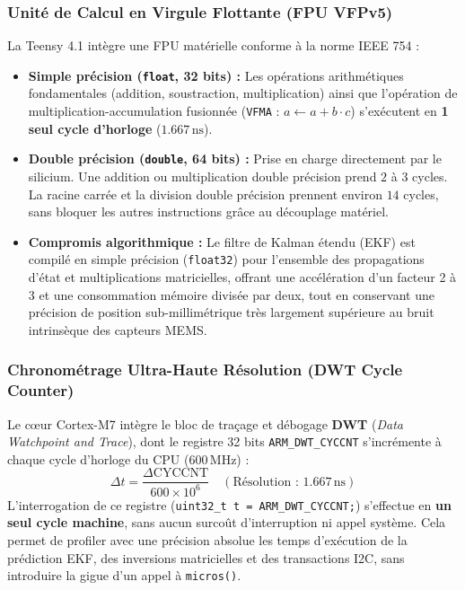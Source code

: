 \documentclass[../Materiel.tex]{subfiles}
\begin{document}
\subsubsection{Unité de Calcul en Virgule Flottante (FPU VFPv5)}
La Teensy 4.1 intègre une FPU matérielle conforme à la norme IEEE 754 :
\begin{itemize}
    \item \textbf{Simple précision (\texttt{float}, 32 bits) :} Les opérations arithmétiques fondamentales (addition, soustraction, multiplication) ainsi que l'opération de multiplication-accumulation fusionnée (\texttt{VFMA} : $a \leftarrow a + b \cdot c$) s'exécutent en \textbf{1 seul cycle d'horloge} ($1.667\,\text{ns}$).
    \item \textbf{Double précision (\texttt{double}, 64 bits) :} Prise en charge directement par le silicium. Une addition ou multiplication double précision prend $2$ à $3$ cycles. La racine carrée et la division double précision prennent environ $14$ cycles, sans bloquer les autres instructions grâce au découplage matériel.
    \item \textbf{Compromis algorithmique :} Le filtre de Kalman étendu (EKF) est compilé en simple précision (\texttt{float32}) pour l'ensemble des propagations d'état et multiplications matricielles, offrant une accélération d'un facteur 2 à 3 et une consommation mémoire divisée par deux, tout en conservant une précision de position sub-millimétrique très largement supérieure au bruit intrinsèque des capteurs MEMS.
\end{itemize}

\subsubsection{Chronométrage Ultra-Haute Résolution (DWT Cycle Counter)}
Le cœur Cortex-M7 intègre le bloc de traçage et débogage \textbf{DWT} (\textit{Data Watchpoint and Trace}), dont le registre 32 bits \texttt{ARM\_DWT\_CYCCNT} s'incrémente à chaque cycle d'horloge du CPU ($600\,\text{MHz}$) :
\begin{equation}
    \Delta t = \frac{\Delta \text{CYCCNT}}{600 \times 10^6} \quad (\text{Résolution : } 1.667\,\text{ns})
\end{equation}
L'interrogation de ce registre (\lstinline|uint32_t t = ARM_DWT_CYCCNT;|) s'effectue en \textbf{un seul cycle machine}, sans aucun surcoût d'interruption ni appel système. Cela permet de profiler avec une précision absolue les temps d'exécution de la prédiction EKF, des inversions matricielles et des transactions I2C, sans introduire la gigue d'un appel à \lstinline|micros()|.
\end{document}
